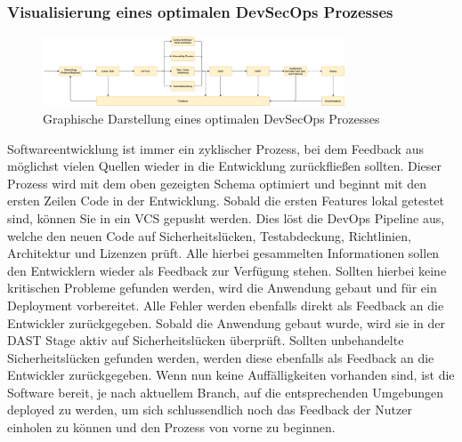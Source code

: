 \subsubsection{Visualisierung eines optimalen DevSecOps Prozesses}
\begin{figure}[H]
    \includegraphics[width=0.8\textwidth]{img/DevOpsWorkflow}
    \centering
    \caption{Graphische Darstellung eines optimalen DevSecOps Prozesses}
    \label{fig:devSecOpsProcess}
\end{figure}

Softwareentwicklung ist immer ein zyklischer Prozess, bei dem Feedback aus möglichst vielen Quellen wieder in die Entwicklung zurückfließen sollten.
Dieser Prozess wird mit dem oben gezeigten Schema optimiert und beginnt mit den ersten Zeilen Code in der Entwicklung.
Sobald die ersten Features lokal getestet sind, können Sie in ein VCS gepusht werden.
Dies löst die DevOps Pipeline aus, welche den neuen Code auf Sicherheitslücken, Testabdeckung, Richtlinien, Architektur und Lizenzen prüft.
Alle hierbei gesammelten Informationen sollen den Entwicklern wieder als Feedback zur Verfügung stehen.
Sollten hierbei keine kritischen Probleme gefunden werden, wird die Anwendung gebaut und für ein Deployment vorbereitet.
Alle Fehler werden ebenfalls direkt als Feedback an die Entwickler zurückgegeben.
Sobald die Anwendung gebaut wurde, wird sie in der DAST Stage aktiv auf Sicherheitslücken überprüft.
Sollten unbehandelte Sicherheitslücken gefunden werden, werden diese ebenfalls als Feedback an die Entwickler zurückgegeben.
Wenn nun keine Auffälligkeiten vorhanden sind, ist die Software bereit, je nach aktuellem Branch, auf die entsprechenden Umgebungen deployed zu werden, um sich schlussendlich noch das Feedback der Nutzer einholen zu können und den Prozess von vorne zu beginnen.